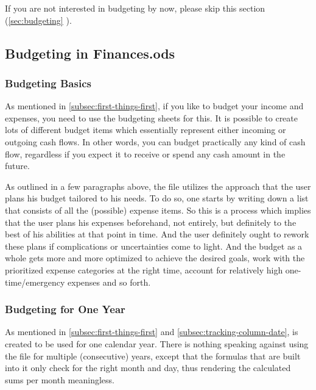 \begin{specialnote}
	If you are not interested in budgeting by now, please skip this section (\autoref{sec:budgeting} ).
\end{specialnote}

\subsection{Budgeting in Finances.ods}
\label{subsec:budgeting-in-finances.ods}

\subsubsection{Budgeting Basics}
\label{subsubsec:budgeting-basics}

As mentioned in \autoref{subsec:first-things-first}, if you like to budget your income and expenses, you need to use the budgeting sheets for this.
It is possible to create lots of different budget items which essentially represent either incoming or outgoing cash flows.
In other words, you can budget practically any kind of cash flow, regardless if you expect it to receive or spend any cash amount in the future.

As outlined in a few paragraphs above, the file utilizes the approach that the user plans his budget tailored to his needs.
To do so, one starts by writing down a list that consists of all the (possible) expense items.
So this is a process which implies that the user plans his expenses beforehand, not entirely, but definitely to the best of his abilities at that point in time.
And the user definitely ought to rework these plans if complications or uncertainties come to light.
And the budget as a whole gets more and more optimized to achieve the desired goals, work with the prioritized expense categories at the right time, account for relatively high one-time/emergency expenses and so forth.

\subsubsection{Budgeting for One Year}
\label{subsubsec:budgeting-for-one-year}

As mentioned in \autoref{subsec:first-things-first} and \autoref{subsec:tracking-column-date}, \tfn is created to be used for one calendar year.
There is nothing speaking against using the file for multiple (consecutive) years, except that the formulas that are built into it only check for the right month and day, thus rendering the calculated sums per month meaningless.

